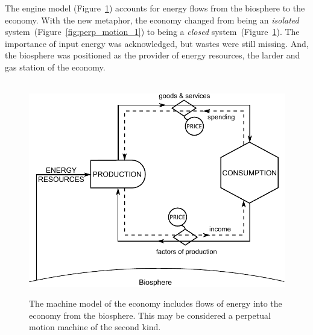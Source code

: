 The engine model (Figure~\ref{fig:perp_motion_2}) 
accounts for energy flows from the biosphere 
to the economy.
With the new metaphor, 
the economy changed 
from being an \emph{isolated} system~(Figure~\ref{fig:perp_motion_1}) 
to being a \emph{closed} system~(Figure~\ref{fig:perp_motion_2}). 
The importance of input energy was acknowledged, 
but wastes were still missing.
And, the biosphere was positioned as the provider of energy resources, 
the larder and gas station of the economy.\cite{Norgaard2010}

\begin{figure}[H]
\centering\
\includegraphics[width=\linewidth]{Part_0/Chapter_Introduction/images/Perpetual_motion_2.pdf}
\caption[The machine model]{The machine model of the economy includes
flows of energy into the economy from the biosphere.
This may be considered a perpetual motion machine 
of the second kind.}
\label{fig:perp_motion_2}
\end{figure}

